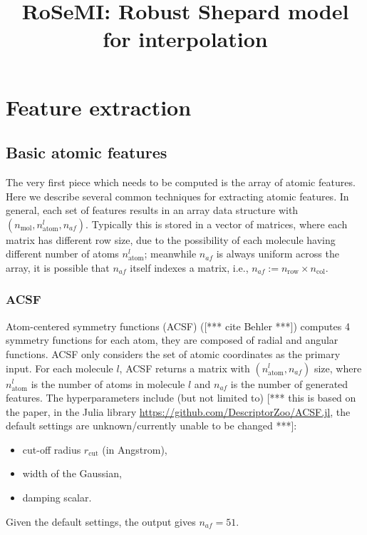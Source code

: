 \documentclass[12pt]{article}
\title{RoSeMI: Robust Shepard model for interpolation}
\def\att{                    %
        \marginpar[ \hspace*{\fill} \raisebox{-0.2em}{\rule{2mm}{1.2em}} ]
        {\raisebox{-0.2em}{\rule{2mm}{1.2em}} }
        }
\def\at#1{[*** \att #1 ***]}  %
\begin{document}
\maketitle

\tableofcontents

\section{Feature extraction}
\label{sec:feature_extraction}

\subsection{Basic atomic features}
\label{subsec:basic_atomic_features}
The very first piece which needs to be computed is the array of atomic features. 
Here we describe several common techniques for extracting atomic features. In general, each set of features results in an array data structure with $(n_\text{mol}, n^l_\text{atom}, n_{af})$. Typically this is stored in a vector of matrices, where each matrix has different row size, due to the possibility of each molecule having different number of atoms $n^l_\text{atom}$; meanwhile $n_{af}$ is always uniform across the array, it is possible that $n_{af}$ itself indexes a matrix, i.e., $n_{af} := n_\text{row} \times n_\text{col}$. 

\subsubsection{ACSF}
Atom-centered symmetry functions (ACSF) (\at{cite Behler}) computes 4 symmetry functions for each atom, they are composed of radial and angular functions. ACSF only considers the set of atomic coordinates as the primary input. For each molecule $l$, ACSF returns a matrix with $(n^l_\text{atom}, n_{af})$ size, where $n^l_\text{atom}$ is the number of atoms in molecule $l$ and $n_{af}$ is the number of generated features. The hyperparameters include (but not limited to) \at{this is based on the paper, in the Julia library \url{https://github.com/DescriptorZoo/ACSF.jl}, the default settings are unknown/currently unable to be changed}:
\begin{itemize}
	\item cut-off radius $r_\text{cut}$ (in Angstrom),
	\item width of the Gaussian,
	\item damping scalar.
\end{itemize}
Given the default settings, the output gives $n_{af} = 51$.
\end{document}
